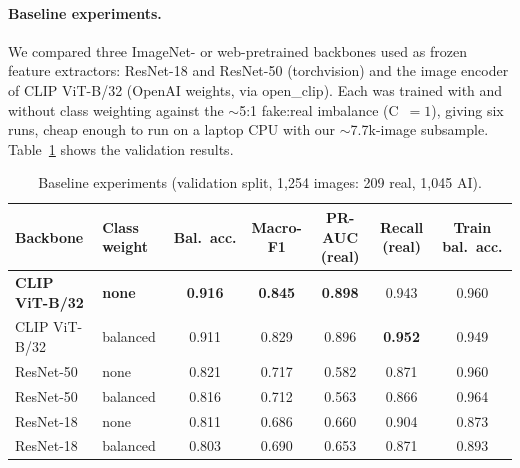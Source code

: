 \documentclass[11pt]{article}
\begin{document}

\paragraph{Baseline experiments.} We compared three ImageNet- or web-pretrained backbones used as frozen feature extractors: ResNet-18 and ResNet-50 (torchvision) and the image encoder of CLIP ViT-B/32 (OpenAI weights, via open\_clip). Each was trained with and without class weighting against the $\sim$5:1 fake:real imbalance (C~$=1$), giving six runs, cheap enough to run on a laptop CPU with our $\sim$7.7k-image subsample. Table~\ref{tab:baselines} shows the validation results.

\begin{table}[h]
\centering
\small
\setlength{\tabcolsep}{3.5pt}
\begin{tabular}{@{}llccccc@{}}
\toprule
\textbf{Backbone} & \textbf{Class weight} & \textbf{Bal.\ acc.} & \textbf{Macro-F1} & \textbf{PR-AUC (real)} & \textbf{Recall (real)} & \textbf{Train bal.\ acc.} \\
\midrule
\textbf{CLIP ViT-B/32} & \textbf{none} & \textbf{0.916} & \textbf{0.845} & \textbf{0.898} & 0.943 & 0.960 \\
CLIP ViT-B/32 & balanced & 0.911 & 0.829 & 0.896 & \textbf{0.952} & 0.949 \\
ResNet-50 & none & 0.821 & 0.717 & 0.582 & 0.871 & 0.960 \\
ResNet-50 & balanced & 0.816 & 0.712 & 0.563 & 0.866 & 0.964 \\
ResNet-18 & none & 0.811 & 0.686 & 0.660 & 0.904 & 0.873 \\
ResNet-18 & balanced & 0.803 & 0.690 & 0.653 & 0.871 & 0.893 \\
\bottomrule
\end{tabular}
\caption{Baseline experiments (validation split, 1{,}254 images: 209 real, 1{,}045 AI).}
\label{tab:baselines}
\end{table}
\end{document}
